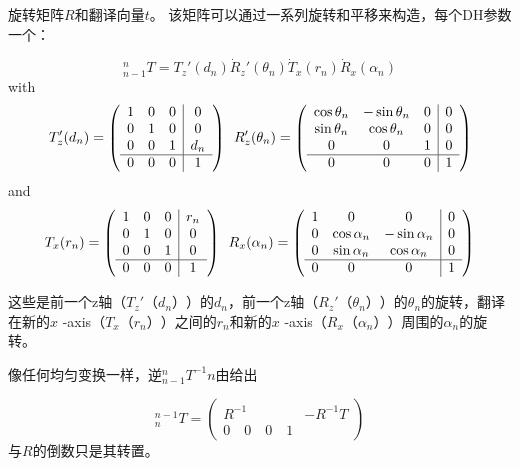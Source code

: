 旋转矩阵$ R $和翻译向量$ t $。 该矩阵可以通过一系列旋转和平移来构造，每个DH参数一个：

\begin{equation}
_{n-1}^nT=T_z'(d_n)\dot R_z'(\theta_n) \dot T_x(r_n) \dot R_x(\alpha_n)
\end{equation}
with
\begin{equation}
T_z'(d_n)=
\left(
\begin{array}{ccc|c}
1 & 0 & 0 & 0\\
0 & 1 & 0 & 0\\
0 & 0 & 1 & d_n\\
\hline
0 & 0 & 0 & 1
\end{array}
\right)
\enskip
R_z'(\theta_n)=\left(
\begin{array}{ccc|c}
\cos\theta_n & -\sin\theta_n & 0 & 0\\
\sin\theta_n & \cos\theta_n & 0 & 0\\
0 & 0 & 1 & 0\\
\hline
0 & 0 & 0 & 1
\end{array}
\right)
\end{equation}
and
\begin{equation}
T_x(r_n)=
\left(
\begin{array}{ccc|c}
1 & 0 & 0 & r_n\\
0 & 1 & 0 & 0\\
0 & 0 & 1 & 0\\
\hline
0 & 0 & 0 & 1
\end{array}
\right)
\enskip
R_x(\alpha_n)=\left(
\begin{array}{ccc|c}
1 & 0 & 0 & 0\\
0 & \cos\alpha_n & -\sin\alpha_n & 0\\
0 & \sin\alpha_n & \cos\alpha_n & 0\\
\hline
0 & 0 & 0 & 1
\end{array}
\right)
\end{equation} 

这些是前一个z轴（$ T_z'（d_n）$）的$ d_n $，前一个z轴（$ R_z'（\theta_n）$）的$ \theta_n $的旋转，翻译 在新的$ x $ -axis（$ T_x（r_n）$）之间的$ r_n $和新的$ x $ -axis（$ R_x（\alpha_n）$）周围的$ \alpha_n $的旋转。


像任何均匀变换一样，逆$ _ {n-1} ^ nT ^ { - 1} n $由给出

\begin{equation}
^{n-1}_nT=\left(
\begin{array}{c|c}
R^{-1} & -R^{-1}T\\
\hline
0 \quad 0 \quad 0 \quad 1
\end{array}
\right)
\end{equation}
与$ R $的倒数只是其转置。
